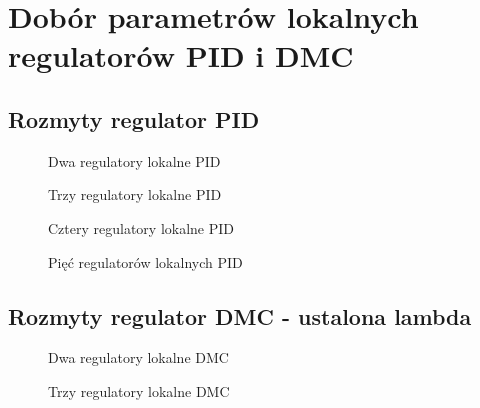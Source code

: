 \section{Dobór parametrów lokalnych regulatorów PID i DMC}
\label{projekt:zad6}


\subsection{Rozmyty regulator PID}
\label{projekt:zad6:PID}

\begin{figure}[H] 
   \centering
   
   \caption{Dwa regulatory lokalne PID}
   \label{projekt:zad6:PID:2:figure}
\end{figure}

\begin{figure}[H] 
   \centering
   
   \caption{Trzy regulatory lokalne PID}
   \label{projekt:zad6:PID:3:figure}
\end{figure}

\begin{figure}[H] 
   \centering
   
   \caption{Cztery regulatory lokalne PID}
   \label{projekt:zad6:PID:4:figure}
\end{figure}

\begin{figure}[H] 
   \centering
   
   \caption{Pięć regulatorów lokalnych PID}
   \label{projekt:zad6:PID:5:figure}
\end{figure}



\newpage

\subsection{Rozmyty regulator DMC - ustalona lambda}
\label{projekt:zad6:DMC}

\begin{figure}[H] 
   \centering
   
   \caption{Dwa regulatory lokalne DMC}
   \label{projekt:zad6:DMC:2:figure}
\end{figure}

\begin{figure}[H] 
   \centering
   
   \caption{Trzy regulatory lokalne DMC}
   \label{projekt:zad6:DMC:3:figure}
\end{figure}


